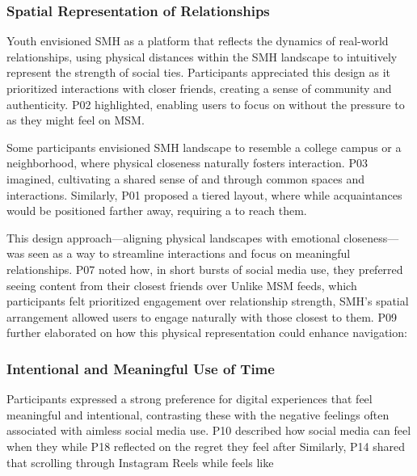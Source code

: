 \subsubsection{Spatial Representation of Relationships}
\label{lab:4-5-3}
Youth envisioned SMH as a platform that reflects the dynamics of real-world relationships, using physical distances within the SMH landscape to intuitively represent the strength of social ties. Participants appreciated this design as it prioritized interactions with closer friends, creating a sense of community and authenticity. P02 highlighted,  enabling users to focus on  without the pressure to  as they might feel on MSM.

Some participants envisioned SMH landscape to resemble a college campus or a neighborhood, where physical closeness naturally fosters interaction. P03 imagined,  cultivating a shared sense of  and  through common spaces and interactions. Similarly, P01 proposed a tiered layout, where  while acquaintances would be positioned farther away, requiring a  to reach them. 

This design approach---aligning physical landscapes with emotional closeness---was seen as a way to streamline interactions and focus on meaningful relationships. P07 noted how, in short bursts of social media use, they preferred seeing content from their closest friends over  Unlike MSM feeds, which participants felt prioritized engagement over relationship strength, SMH's spatial arrangement allowed users to engage naturally with those closest to them. P09 further elaborated on how this physical representation could enhance navigation: 

\subsubsection{Intentional and Meaningful Use of Time}
\label{lab:4-5-4}
Participants expressed a strong preference for digital experiences that feel meaningful and intentional, contrasting these with the negative feelings often associated with aimless social media use. P10 described how social media can feel  when they  while P18 reflected on the regret they feel after  Similarly, P14 shared that scrolling through Instagram Reels while  feels like 


